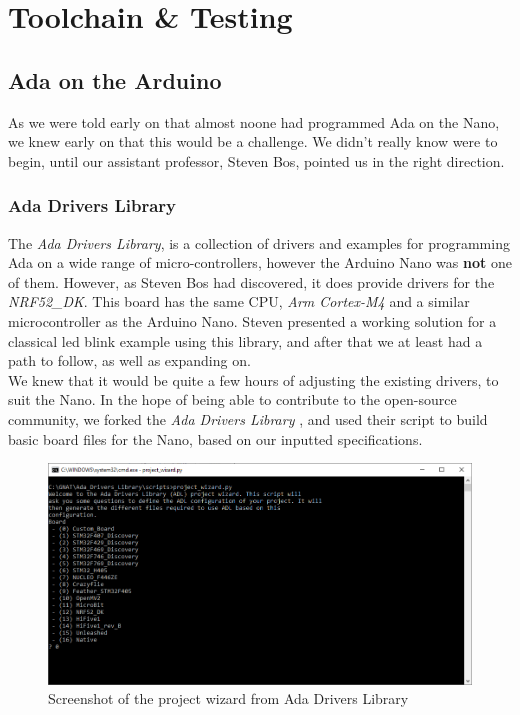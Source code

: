 \documentclass{article}
\begin{document}
\section{Toolchain \& Testing}
\subsection{Ada on the Arduino}
As we were told early on that almost noone had programmed Ada on the Nano, we knew early on that this would be a challenge. We didn't really know were to begin, until our assistant professor, Steven Bos, pointed us in the right direction. 

\subsubsection{Ada Drivers Library}

The \textit{Ada Drivers Library}, is a collection of drivers and examples for programming Ada on a wide range of micro-controllers, however the Arduino Nano was \textbf{not} one of them. However, as Steven Bos had discovered, it does provide drivers for the \textit{NRF52\_DK}. This board has the same CPU, \textit{Arm Cortex-M4} and a similar microcontroller as the Arduino Nano. Steven presented a working solution for a classical led blink example using this library, and after that we at least had a path to follow, as well as expanding on.\\ 

We knew that it would be quite a few hours of adjusting the existing drivers, to suit the Nano. In the hope of being able to contribute to the open-source community, we forked the \textit{Ada Drivers Library}
, and used their script to build basic board files for the Nano, based on our inputted specifications. 

\begin{figure}[H]
  \centering
  \includegraphics[width=\linewidth]{projectWizard.png}
  \caption{Screenshot of the project wizard from Ada Drivers Library}
  \label{projectWizard}
\end{figure}
\end{document}
